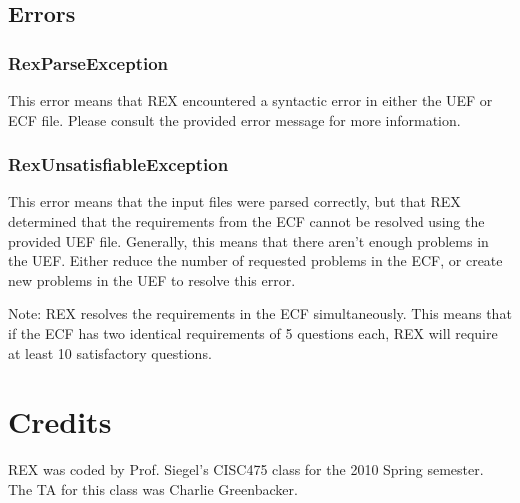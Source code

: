 \documentclass{article}
\begin{document}
\subsection{Errors}
\subsubsection{RexParseException}
This error means that REX encountered a syntactic error in either the
UEF or ECF file. Please consult the provided error message for more
information.

\subsubsection{RexUnsatisfiableException}
This error means that the input files were parsed correctly, but that
REX determined that the requirements from the ECF cannot be resolved
using the provided UEF file. Generally, this means that there aren't
enough problems in the UEF. Either reduce the number of requested
problems in the ECF, or create new problems in the UEF to resolve
this error.

Note: REX resolves the requirements in the ECF simultaneously. This means
that if the ECF has two identical requirements of 5 questions each, REX
will require at least 10 satisfactory questions.

\section{Credits}
REX was coded by Prof. Siegel's CISC475 class for the 2010 Spring
semester. The TA for this class was Charlie Greenbacker.
\end{document}
